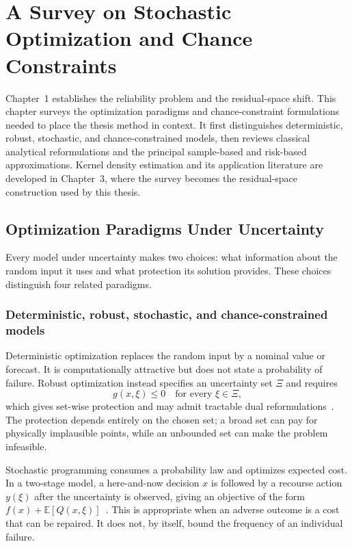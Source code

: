 \graphicspath{{kap02/figures/}{./figures/}}
\section{A Survey on Stochastic Optimization and Chance Constraints}
\label{ch:survey}

Chapter~1 establishes the reliability problem and the residual-space shift. This chapter surveys the optimization paradigms and chance-constraint formulations needed to place the thesis method in context. It first distinguishes deterministic, robust, stochastic, and chance-constrained models, then reviews classical analytical reformulations and the principal sample-based and risk-based approximations. Kernel density estimation and its application literature are developed in Chapter~3, where the survey becomes the residual-space construction used by this thesis.

\subsection{Optimization Paradigms Under Uncertainty}
\label{sec:taxonomy}

Every model under uncertainty makes two choices: what information about the random input it uses and what protection its solution provides. These choices distinguish four related paradigms.

\subsubsection{Deterministic, robust, stochastic, and chance-constrained models}
\label{ssec:paradigms}

Deterministic optimization replaces the random input by a nominal value or forecast. It is computationally attractive but does not state a probability of failure. Robust optimization instead specifies an uncertainty set $\Xi$ and requires
\begin{equation}
  g(x,\xi)\leq0\quad\text{for every }\xi\in\Xi,
  \label{eq:ch2-robust}
\end{equation}
which gives set-wise protection and may admit tractable dual reformulations~\citep{soyster1973,bental2009}. The protection depends entirely on the chosen set; a broad set can pay for physically implausible points, while an unbounded set can make the problem infeasible.

Stochastic programming consumes a probability law and optimizes expected cost. In a two-stage model, a here-and-now decision $x$ is followed by a recourse action $y(\xi)$ after the uncertainty is observed, giving an objective of the form $f(x)+\mathbb E[Q(x,\xi)]$~\citep{dantzig1955,birge2011}. This is appropriate when an adverse outcome is a cost that can be repaired. It does not, by itself, bound the frequency of an individual failure.

